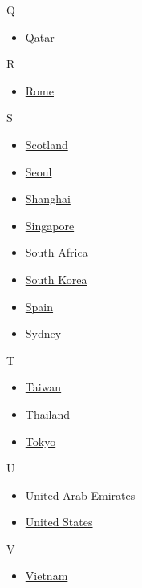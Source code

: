 Q

\begin{itemize}
\tightlist
\item
  \href{/travel/destinations/qatar}{Qatar}
\end{itemize}

R

\begin{itemize}
\tightlist
\item
  \href{/travel/destinations/rome}{Rome}
\end{itemize}

S

\begin{itemize}
\tightlist
\item
  \href{/travel/destinations/scotland}{Scotland}
\item
  \href{/travel/destinations/seoul}{Seoul}
\item
  \href{/travel/destinations/shanghai}{Shanghai}
\item
  \href{/travel/destinations/singapore}{Singapore}
\item
  \href{/travel/destinations/south-africa}{South Africa}
\item
  \href{/travel/destinations/south-korea}{South Korea}
\item
  \href{/travel/destinations/spain}{Spain}
\item
  \href{/travel/destinations/sydney}{Sydney}
\end{itemize}

T

\begin{itemize}
\tightlist
\item
  \href{/travel/destinations/taiwan}{Taiwan}
\item
  \href{/travel/destinations/thailand}{Thailand}
\item
  \href{/travel/destinations/tokyo}{Tokyo}
\end{itemize}

U

\begin{itemize}
\tightlist
\item
  \href{/travel/destinations/uae}{United Arab Emirates}
\item
  \href{/travel/destinations/usa}{United States}
\end{itemize}

V

\begin{itemize}
\tightlist
\item
  \href{/travel/destinations/vietnam}{Vietnam}
\end{itemize}

